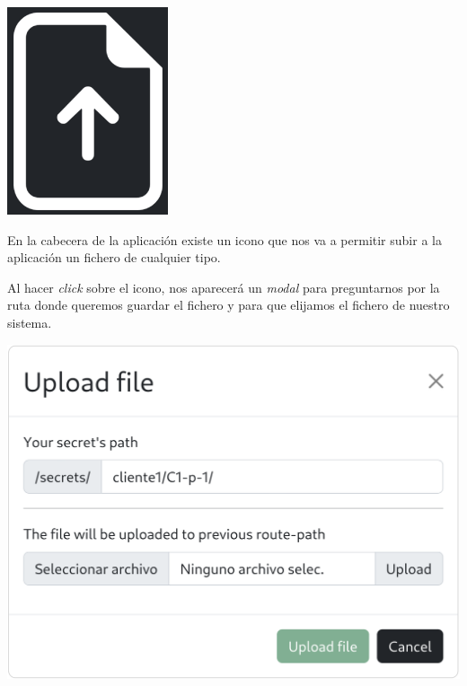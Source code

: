\documentclass{\ClassPath/viu-tfm-template}
\begin{document}
{
    \begin{minipage}{0.1\linewidth}
        \includegraphics[width=\linewidth]{img/upload.png}
    \end{minipage}
    \hspace{0.5cm}
    \begin{minipage}{0.9\linewidth}
        En la cabecera de la aplicación existe un icono que nos va a permitir subir a la aplicación un fichero de cualquier tipo.

        Al hacer \textit{click} sobre el icono, nos aparecerá un \textit{modal} para preguntarnos por la ruta donde queremos guardar el fichero y para que elijamos el fichero de nuestro sistema.
    \end{minipage}
}

\begin{center}
    \includegraphics[width=0.7\linewidth]{img/upload_modal.png}
\end{center}
\end{document}
